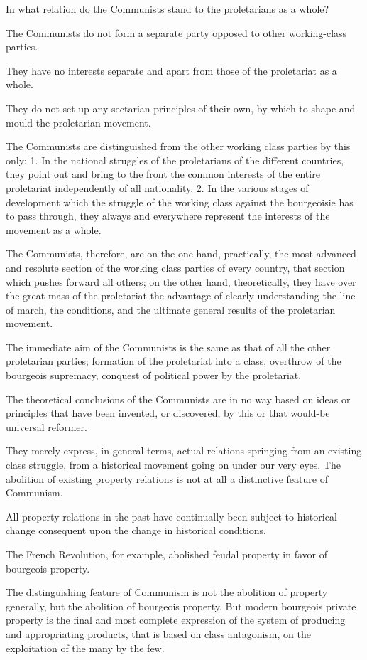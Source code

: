 In what relation do the Communists stand to the proletarians as a whole?

The Communists do not form a separate party opposed to other working-class parties.

They have no interests separate and apart from those of the proletariat as a whole.

They do not set up any sectarian principles of their own, by which to shape and mould the proletarian movement.

The Communists are distinguished from the other working class parties by this only: 1. In the national struggles of the proletarians of the different countries, they point out and bring to the front the common interests of the entire proletariat independently of all nationality. 2. In the various stages of development which the struggle of the working class against the bourgeoisie has to pass through, they always and everywhere represent the interests of the movement as a whole.

The Communists, therefore, are on the one hand, practically, the most advanced and resolute section of the working class parties of every country, that section which pushes forward all others; on the other hand, theoretically, they have over the great mass of the proletariat the advantage of clearly understanding the line of march, the conditions, and the ultimate general results of the proletarian movement.

The immediate aim of the Communists is the same as that of all the other proletarian parties; formation of the proletariat into a class, overthrow of the bourgeois supremacy, conquest of political power by the proletariat.

The theoretical conclusions of the Communists are in no way based on ideas or principles that have been invented, or discovered, by this or that would-be universal reformer.

They merely express, in general terms, actual relations springing from an existing class struggle, from a historical movement going on under our very eyes. The abolition of existing property relations is not at all a distinctive feature of Communism.

All property relations in the past have continually been subject to historical change consequent upon the change in historical conditions.

The French Revolution, for example, abolished feudal property in favor of bourgeois property.

The distinguishing feature of Communism is not the abolition of property generally, but the abolition of bourgeois property. But modern bourgeois private property is the final and most complete expression of the system of producing and appropriating products, that is based on class antagonism, on the exploitation of the many by the few.

